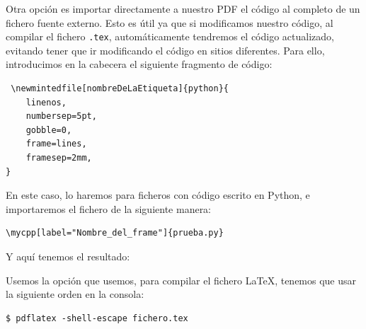 \documentclass[a4paper]{article}
\begin{document}
Otra opción es importar directamente a nuestro PDF el código al completo de un fichero fuente externo. Esto es útil ya que si modificamos nuestro código, al compilar el fichero \texttt{.tex}, automáticamente tendremos el código actualizado, evitando tener que ir modificando el código en sitios diferentes. Para ello, introducimos en la cabecera el siguiente fragmento de código:

\begin{verbatim}
 \newmintedfile[nombreDeLaEtiqueta]{python}{
    linenos,
    numbersep=5pt,
    gobble=0,
    frame=lines,
    framesep=2mm,
}
\end{verbatim}

En este caso, lo haremos para ficheros con código escrito en Python, e importaremos el fichero de la siguiente manera:
\begin{verbatim}
\mycpp[label="Nombre_del_frame"]{prueba.py}
\end{verbatim}

Y aquí tenemos el resultado: 

Usemos la opción que usemos, para compilar el fichero \LaTeX, tenemos que usar la siguiente orden en la consola:

\begin{verbatim}
$ pdflatex -shell-escape fichero.tex
\end{verbatim}
\end{document}
